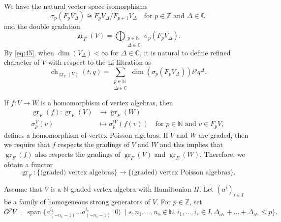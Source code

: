 \documentclass[a4paper, 12pt, reqno]{amsart}
\theoremstyle{remark}
\numberwithin{equation}{subsection}
\DeclareMathOperator{\gr}{gr}
\DeclareMathOperator{\ch}{ch}
\DeclareMathOperator{\vspan}{span}
\DeclareMathOperator{\vac}{|0\rangle}
\begin{document}
We have the natural vector space isomorphisms
\begin{equation*}
  \sigma_p(F_pV_{\Delta}) \cong F_pV_{\Delta}/F_{p + 1}V_{\Delta} \quad \text{for }p \in \mathbb{Z}\text{ and }\Delta \in \mathbb{C}
\end{equation*}
and the double gradation
\begin{equation}
  \label{eq:45}
  \gr_F(V) =\bigoplus_{\substack{p \in \mathbb{N} \\ \Delta \in \mathbb{C}}}\sigma_p(F_pV_{\Delta}).
\end{equation}
By \eqref{eq:45}, when $\dim(V_{\Delta}) < \infty$ for $\Delta \in \mathbb{C}$, it is natural to define refined character of $V$ with respect to the Li filtration as
\begin{equation*}
  \ch_{\gr_F(V)}(t, q) = \sum_{\substack{p \in \mathbb{N} \\ \Delta \in \mathbb{C}}}\dim(\sigma_p(F_pV_{\Delta}))t^pq^{\Delta}.
\end{equation*}

If $f: V \to W$ is a homomorphism of vertex algebras, then
\begin{align*}
  \gr_F(f): \gr_F(V) &\to \gr_F(W) \\
  \sigma^V_p(v) &\mapsto \sigma^W_p(f(v)) \quad \text{for }p \in \mathbb{N}\text{ and } v \in F_pV,
\end{align*}
defines a homomorphism of vertex Poisson algebras.
If $V$ and $W$ are graded, then we require that $f$ respects the gradings of $V$ and $W$ and this implies that $\gr_F(f)$ also respects the gradings of $\gr_F(V)$ and $\gr_F(W)$.
Therefore, we obtain a functor
\begin{equation*}
  \gr_F: \{\text{(graded) vertex algebras}\} \to \{\text{(graded) vertex Poisson algebras}\}.
\end{equation*}

Assume that $V$ is a $\mathbb{N}$-graded vertex algebra with Hamiltonian $H$.
Let $(a^i)_{i \in I}$ be a family of homogeneous strong generators of $V$.
For $p \in \mathbb{Z}$, set
\begin{equation*}
  G^pV = \vspan\{a^{i_1}_{(-n_1 - 1)}\dots a^{i_s}_{(-n_s - 1)}\vac \mid s, n_1, \dots, n_s \in \mathbb{N}, i_1, \dots, i_s \in I, \Delta_{a^{i_1}} + \dots + \Delta_{a^{i_s}} \le p\}.
\end{equation*}
\end{document}
